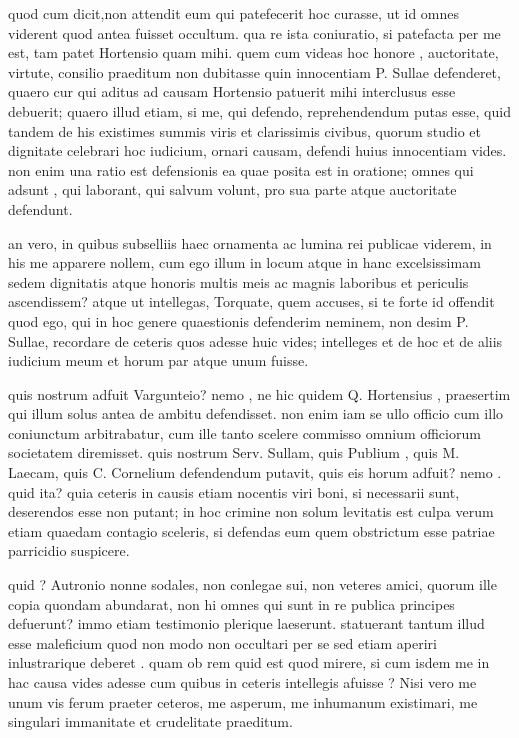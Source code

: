  quod cum dicit,non attendit eum qui patefecerit hoc curasse, ut id omnes viderent quod antea fuisset occultum. qua re ista coniuratio, si patefacta per me est, tam patet Hortensio quam mihi. quem cum videas hoc honore , auctoritate, virtute, consilio praeditum non dubitasse quin innocentiam P. Sullae defenderet, quaero cur qui aditus ad causam Hortensio patuerit mihi interclusus esse debuerit; quaero illud etiam, si me, qui defendo, reprehendendum putas esse, quid tandem de his existimes summis viris et clarissimis civibus, quorum studio et dignitate celebrari hoc iudicium, ornari causam, defendi huius innocentiam vides. non enim una ratio est defensionis ea quae posita est in oratione; omnes qui adsunt , qui laborant, qui salvum volunt, pro sua parte atque auctoritate defendunt.

 an vero, in quibus subselliis haec ornamenta ac lumina rei publicae viderem, in his me apparere nollem, cum ego illum in locum atque in hanc excelsissimam sedem dignitatis atque honoris multis meis ac magnis laboribus et periculis ascendissem? atque ut intellegas, Torquate, quem accuses, si te forte id offendit quod ego, qui in hoc genere quaestionis defenderim neminem, non desim P. Sullae, recordare de ceteris quos adesse huic vides; intelleges et de hoc et de aliis iudicium meum et horum par atque unum fuisse.

 quis nostrum adfuit Vargunteio? nemo , ne hic quidem Q. Hortensius , praesertim qui illum solus antea de ambitu defendisset. non enim iam se ullo officio cum illo coniunctum arbitrabatur, cum ille tanto scelere commisso omnium officiorum societatem diremisset. quis nostrum Serv. Sullam, quis Publium , quis M. Laecam, quis C. Cornelium defendendum putavit, quis eis horum adfuit? nemo . quid ita? quia ceteris in causis etiam nocentis viri boni, si necessarii sunt, deserendos esse non putant; in hoc crimine non solum levitatis est culpa verum etiam quaedam contagio sceleris, si defendas eum quem obstrictum esse patriae parricidio suspicere.

 quid ? Autronio nonne sodales, non conlegae sui, non veteres amici, quorum ille copia quondam abundarat, non hi omnes qui sunt in re publica principes defuerunt? immo etiam testimonio plerique laeserunt. statuerant tantum illud esse maleficium quod non modo non occultari per se sed etiam aperiri inlustrarique deberet . quam ob rem quid est quod mirere, si cum isdem me in hac causa vides adesse cum quibus in ceteris intellegis afuisse ? Nisi vero me unum vis ferum praeter ceteros, me asperum, me inhumanum existimari, me singulari immanitate et crudelitate praeditum.

